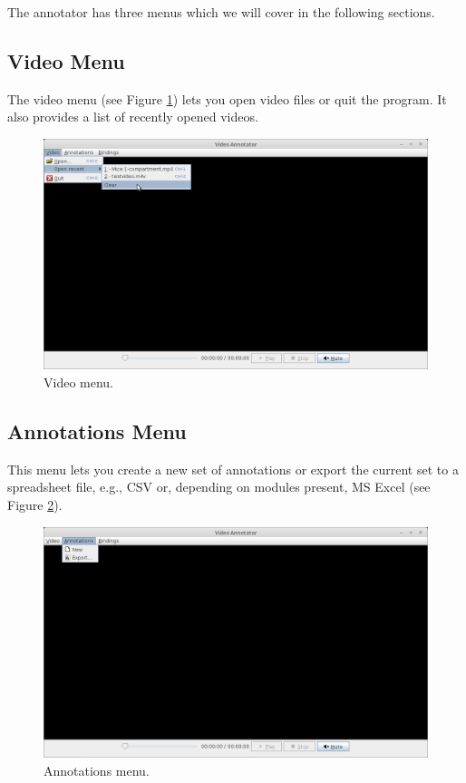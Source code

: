 \documentclass[a4paper]{book}
\begin{document}
The annotator has three menus which we will cover in the following sections.

\subsection{Video Menu}
The video menu (see Figure \ref{AnnotatorVideoMenu}) lets you open video
files or quit the program. It also provides a list of recently opened videos.

\begin{figure}[htb]
  \centering
  \includegraphics[width=12.0cm]{images/AnnotatorVideoMenu.png}
  \caption{Video menu.}
  \label{AnnotatorVideoMenu}
\end{figure}

\subsection{Annotations Menu}
This menu lets you create a new set of annotations or export the current
set to a spreadsheet file, e.g., CSV or, depending on modules present,
MS Excel (see Figure \ref{AnnotatorAnnotationMenu}).

\begin{figure}[htb]
  \centering
  \includegraphics[width=12.0cm]{images/AnnotatorAnnotationMenu.png}
  \caption{Annotations menu.}
  \label{AnnotatorAnnotationMenu}
\end{figure}
\end{document}
